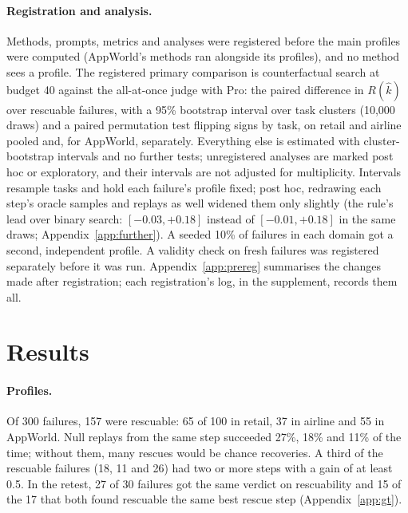 \documentclass[11pt]{article}
\newcommand{\Rhat}{R(\hat{k})}
\begin{document}
\paragraph{Registration and analysis.} Methods, prompts, metrics and analyses were registered before the main profiles were computed (AppWorld's methods ran alongside its profiles), and no method sees a profile. The registered primary comparison is counterfactual search at budget 40 against the all-at-once judge with Pro: the paired difference in $\Rhat$ over rescuable failures, with a 95\% bootstrap interval over task clusters (10{,}000 draws) and a paired permutation test flipping signs by task, on retail and airline pooled and, for AppWorld, separately. Everything else is estimated with cluster-bootstrap intervals and no further tests; unregistered analyses are marked post hoc or exploratory, and their intervals are not adjusted for multiplicity. Intervals resample tasks and hold each failure's profile fixed; post hoc, redrawing each step's oracle samples and replays as well widened them only slightly (the rule's lead over binary search: $[-0.03,+0.18]$ instead of $[-0.01,+0.18]$ in the same draws; Appendix~\ref{app:further}). A seeded 10\% of failures in each domain got a second, independent profile. A validity check on fresh failures was registered separately before it was run. Appendix~\ref{app:prereg} summarises the changes made after registration; each registration's log, in the supplement, records them all.

\section{Results}
\label{sec:results}

\paragraph{Profiles.} Of 300 failures, 157 were rescuable: 65 of 100 in retail, 37 in airline and 55 in AppWorld. Null replays from the same step succeeded 27\%, 18\% and 11\% of the time; without them, many rescues would be chance recoveries. A third of the rescuable failures (18, 11 and 26) had two or more steps with a gain of at least 0.5. In the retest, 27 of 30 failures got the same verdict on rescuability and 15 of the 17 that both found rescuable the same best rescue step (Appendix~\ref{app:gt}).
\end{document}
